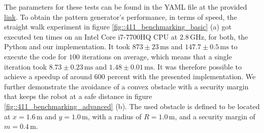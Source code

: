 The parameters for these tests can be found in the YAML file at the provided \href{https://github.com/mhubii/nmpc_pattern_generator/blob/719fde0bb73925923de85cbf379c5523e075dfeb/libs/pattern_generator/configs_hrp2.yaml#L1}{\underline{link}}. To obtain the pattern generator's performance, in terms of speed, the straight walk experiment in figure \ref{fig::411_benchmarking_basic} (a) got executed ten times on an Intel Core i7-7700HQ CPU at $2.8\,\text{GHz}$, for both, the Python and our implementation. It took $873\pm23\,\text{ms}$ and $147.7\pm0.5\,\text{ms}$ to execute the code for $100$ iterations on average, which means that a single iteration took $8.73\pm0.23\,\text{ms}$ and $1.48\pm0.01\,\text{ms}$. It was therefore possible to achieve a speedup of around $600$ percent with the presented implementation. We further demonstrate the avoidance of a convex obstacle with a security margin that keeps the robot at a safe distance in figure \ref{fig::411_benchmarking_advanced} (b). The used obstacle is defined to be located at $x=1.6\,\text{m}$ and $y=1.0\,\text{m}$, with a radius of $R=1.0\,\text{m}$, and a security margin of $m=0.4\,\text{m}$.
